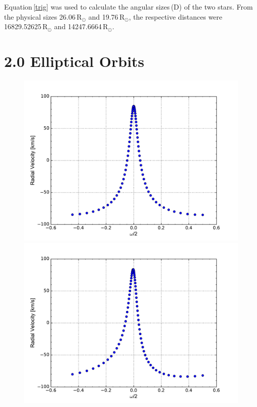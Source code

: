\documentclass[onecolumn]{aastex6}
\begin{document}
Equation\,\ref{trig} was used to calculate the angular sizes\,(D) of the two stars. From the physical sizes 26.06\,R$_\odot$ and 19.76\,R$_\odot$, the respective distances were 16829.52625\,R$_\odot$ and 14247.6664\,R$_\odot$.
\clearpage
\section{2.0 Elliptical Orbits}

\begin{figure}[ht]
  \centering
  \includegraphics[scale=0.3]{a.pdf}%
  \includegraphics[scale=0.3]{b.pdf}%

\end{figure}
\end{document}
